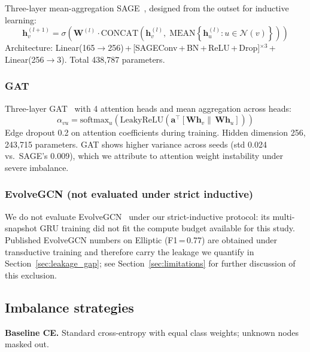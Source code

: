Three-layer mean-aggregation SAGE~\citep{hamilton2017}, designed from
the outset for inductive learning:
\begin{equation}
\mathbf{h}_v^{(l+1)} = \sigma\!\left(
  \mathbf{W}^{(l)} \!\cdot\!
  \text{CONCAT}\!\left(
    \mathbf{h}_v^{(l)},\;
    \text{MEAN}\!\left\{\mathbf{h}_u^{(l)}: u\!\in\!\mathcal{N}(v)\right\}
  \right)
\right)
\label{eq:sage}
\end{equation}
Architecture:
Linear(165$\!\to\!$256)\,+\,[SAGEConv\,+\,BN\,+\,ReLU\,+\,Drop]$^{\times3}$\,+\,Linear(256$\!\to\!$3).
Total 438,787 parameters.

\subsubsection{GAT}

Three-layer GAT~\citep{velickovic2018} with 4 attention heads and mean
aggregation across heads:
\begin{equation}
\alpha_{vu} = \text{softmax}_u\!\left(
  \text{LeakyReLU}\!\left(
    \mathbf{a}^\top\!\left[\mathbf{W}\mathbf{h}_v \|\, \mathbf{W}\mathbf{h}_u\right]
  \right)
\right)
\label{eq:gat}
\end{equation}
Edge dropout 0.2 on attention coefficients during training.  Hidden
dimension 256, 243,715 parameters.  GAT shows higher variance across
seeds (std 0.024 vs.\ SAGE's 0.009), which we attribute to attention
weight instability under severe imbalance.

\subsubsection{EvolveGCN (not evaluated under strict inductive)}

We do not evaluate EvolveGCN~\citep{pareja2020evolvegcn} under our
strict-inductive protocol: its multi-snapshot GRU training did not
fit the compute budget available for this study.  Published
EvolveGCN numbers on Elliptic (F1\,=\,0.77) are obtained under
transductive training and therefore carry the leakage we quantify
in Section~\ref{sec:leakage_gap}; see
Section~\ref{sec:limitations} for further discussion of this
exclusion.

\subsection{Imbalance strategies}

\textbf{Baseline CE.}  Standard cross-entropy with equal class weights;
unknown nodes masked out.


